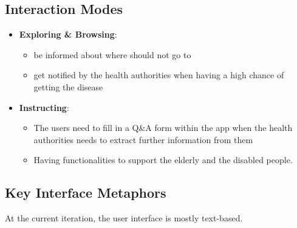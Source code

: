   \subsection{Interaction Modes}
    \begin{itemize}
      \item \textbf{Exploring \& Browsing}:
        \begin{itemize}
          \item be informed about where should not go to
          \item get notified by the health authorities when having a high chance of getting the disease
        \end{itemize}
      \item \textbf{Instructing}:
        \begin{itemize}
          \item The users need to fill in a Q\&A form within the app when the health authorities needs to extract further information from them
          \item Having functionalities to support the elderly and the disabled people.
        \end{itemize}
    \end{itemize}

  \subsection{Key Interface Metaphors}
    \par At the current iteration, the user interface is mostly text-based.